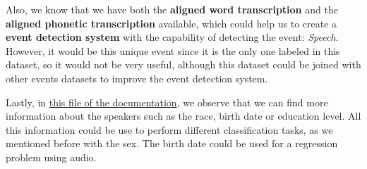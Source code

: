 \documentclass[a4paper]{article}
\begin{document}
\begin{itemize}
        Also, we know that we have both the \textbf{aligned word transcription} and the \textbf{aligned phonetic transcription} available, which could help us to create a \textbf{event detection system} with the capability of detecting the event: \emph{Speech}. However, it would be this unique event since it is the only one labeled in this dataset, so it would not be very useful, although this dataset could be joined with other events datasets to improve the event detection system.

        Lastly, in \href{https://catalog.ldc.upenn.edu/docs/LDC93S1/SPKRINFO.TXT}{this file of the documentation}, we observe that we can find more information about the speakers such as the race, birth date or education level. All this information could be use to perform different classification tasks, as we mentioned before with the sex. The birth date could be used for a regression problem using audio.
\end{itemize}
\end{document}
